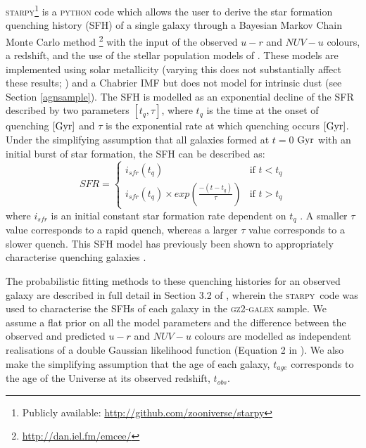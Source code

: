 \documentclass[useAMS,usenatbib]{mn2e}
\def\changed    {\color{nc} }
\def\secondchange    {\color{srv} }
\def\newref    {\color{new} }
\def\starpy ~{\textsc{starpy}}
\begin{document}
\textsc{starpy}\footnote{Publicly available: \url{http://github.com/zooniverse/starpy}} is a \textsc{python} code which allows the user to derive the star formation {\newref quenching} history (SFH) of a single galaxy through a Bayesian Markov Chain Monte Carlo method \citep{Dan}\footnote{\url{http://dan.iel.fm/emcee/}} with the input of the observed $u-r$ and $NUV-u$ colours, a redshift, and the use of the stellar population models of \cite{BC03}. {\changed These models are implemented using solar metallicity (varying this does not substantially affect these results; \citealt{Sme2015}) and a Chabrier IMF \citep{Chab03} {\secondchange but does not model for intrinsic dust (see Section \ref{agnsample})}. The SFH is modelled as an exponential decline of the SFR described by two parameters $[t_q, \tau]$, where $t_q$ is the time at the onset of quenching} $\rm{[Gyr]}$ and $\tau$ is the exponential rate at which quenching occurs $\rm{[Gyr]}$. Under the simplifying assumption that all galaxies formed at $t=0$ $\rm{ Gyr}$ with an initial burst of star formation, the SFH can be described as: 
\begin{equation}\label{sfh}
SFR =
\begin{cases}
i_{sfr}(t_q) & \text{if } t < t_q \\
i_{sfr}(t_q) \times exp{\left( \frac{-(t-t_{q})}{\tau}\right)} & \text{if } t > t_q 
\end{cases}
\end{equation}
where $i_{sfr}$ is an initial constant star formation rate dependent on $t_q$ \citep{Sch2014, Sme2015}.  A smaller $\tau$ value corresponds to a rapid quench, whereas a larger $\tau$ value corresponds to a slower quench. {\changed This SFH model has previously been shown to appropriately characterise quenching galaxies \citep{Weiner06, Martin07, Noeske07,Sch2014}.} 


The probabilistic fitting methods to these quenching histories for an observed galaxy are described in full detail in {\changed Section 3.2 of} \cite{Sme2015}, wherein the \starpy ~~code was used to characterise the SFHs of each galaxy in the \textsc{gz2-galex} sample. {\changed We assume a flat prior on all the model parameters and {\secondchange the difference between the observed and predicted $u-r$ and $NUV-u$ colours are modelled as independent realisations of a double Gaussian likelihood function} (Equation 2 in \citealt{Sme2015}).} {\secondchange We also make the simplifying assumption that the age of each galaxy, $t_{age}$ corresponds to the age of the Universe at its observed redshift, $t_{obs}$.} 
\end{document}

